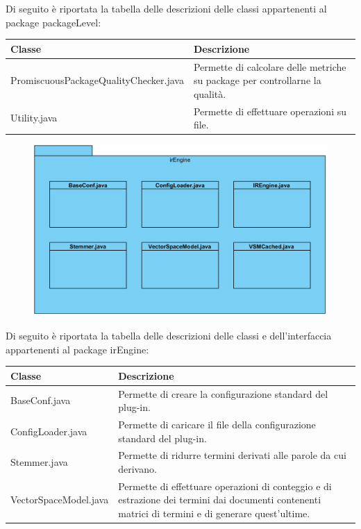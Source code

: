 \documentclass[11pt]{article}
\begin{document}
\begin{description}
\begin{figure}[!h]
		\end{figure}
		Di seguito è riportata la tabella delle descrizioni delle classi appartenenti al package packageLevel:
		\item \begin{tabular}{|p{}|p{}|}
			\hline
			\textbf{Classe} & \textbf{Descrizione}\\
			\hline
			PromiscuousPackageQualityChecker.java & Permette di calcolare delle metriche su package per controllarne la qualità. \\
			\hline
			Utility.java & Permette di effettuare operazioni su file. \\
			\hline
		\end{tabular}	
	\item[ 2.1.1.3.2 Package irEngine] 
	\item \begin{figure}[!h]
		\centering
		\includegraphics{diagrams/IREnginePackageDiagram}
	\end{figure}
	Di seguito è riportata la tabella delle descrizioni delle classi e dell'interfaccia appartenenti al package irEngine:
	\item \begin{tabular}{|p{}|p{}|}
		\hline
		\textbf{Classe} & \textbf{Descrizione}\\
		\hline
		BaseConf.java & Permette di creare la configurazione standard del plug-in. \\
		\hline
		ConfigLoader.java & Permette di caricare il file della configurazione standard del plug-in. \\
		\hline
		Stemmer.java & Permette di ridurre termini derivati alle parole da cui derivano.  \\
		\hline
		VectorSpaceModel.java & Permette di effettuare operazioni di conteggio e di estrazione dei termini dai documenti contenenti matrici di termini e di generare quest'ultime. \\

\end{tabular}
\end{description}
\end{document}
